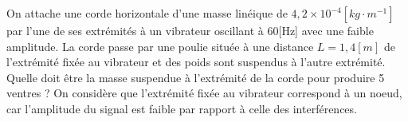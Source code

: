 %
%
    On attache une corde horizontale d'une masse linéique de \(4,2 \times 10^{-4} [kg \cdot m^{-1}]\) par l'une de ses extrémités à un vibrateur oscillant à 60[Hz] avec une faible amplitude. La corde passe par une poulie située à une distance \(L=1,4[m]\) de l'extrémité fixée au vibrateur et des poids sont suspendus à l'autre extrémité.
    Quelle doit être la masse suspendue à l'extrémité de la corde pour produire 5 ventres ? On considère que l'extrémité fixée au vibrateur correspond à un noeud, car l'amplitude du signal est faible par rapport à celle des interférences.
